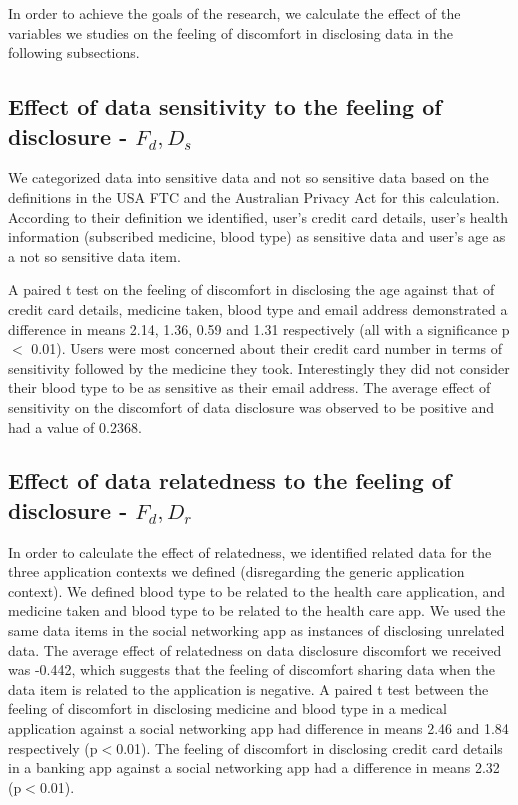 \documentclass[conference]{IEEEtran}
\begin{document}
In order to achieve the goals of the research, we calculate the effect of the variables we studies on the feeling of discomfort in disclosing data in the following subsections.

\subsection{Effect of data sensitivity to the feeling of disclosure -  $F_d,D_s$}

We categorized data into sensitive data and not so sensitive data based on the definitions in the USA FTC \cite {usa2016data} and the Australian Privacy Act \cite {australian2014data} for this calculation. According to their definition we identified, user's credit card details, user's health information (subscribed medicine, blood type) as sensitive data and user's age as a not so sensitive data item. 

A paired t test on the feeling of discomfort in disclosing the age against that of credit card details, medicine taken, blood type and email address demonstrated a difference in means 2.14, 1.36, 0.59 and 1.31 respectively (all with a significance p$<$ 0.01). Users were most concerned about their credit card number in terms of sensitivity followed by the medicine they took. Interestingly they did not consider their blood type to be as sensitive as their email address. The average effect of sensitivity on the discomfort of data disclosure was observed to be positive and had a value of 0.2368.


\subsection{Effect of data relatedness to the feeling of disclosure -  $F_d,D_r$}

In order to calculate the effect of relatedness, we identified related data for the three application contexts we defined (disregarding the generic application context). We defined blood type to be related to the health care application, and medicine taken and blood type to be related to the health care app. We used the same data items in the social networking app as instances of disclosing unrelated data. The average effect of relatedness on data disclosure discomfort we received was -0.442, which suggests that the feeling of discomfort sharing data when the data item is related to the application is negative. A paired t test between the feeling of discomfort in disclosing medicine and blood type in a medical application against a social networking app had difference in means 2.46 and 1.84 respectively (p$<$0.01). The feeling of discomfort in disclosing credit card details in a banking app against a social networking app had a difference in means 2.32 (p$<$0.01). 
\end{document}
